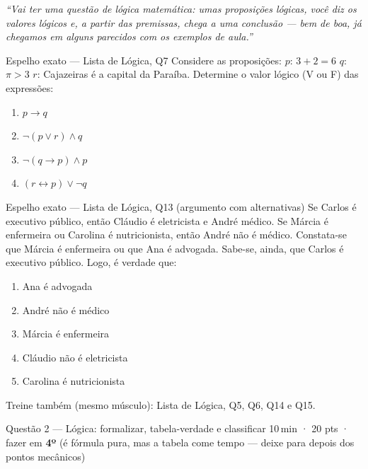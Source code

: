 \documentclass[11pt]{article}
\newcommand{\meta}[1]{{\small\color{inkgray}#1}}
\begin{document}
\begin{profquote}
\small\itshape ``Vai ter uma questão de lógica matemática: umas proposições lógicas, você diz os valores lógicos e, a partir das premissas, chega a uma conclusão — bem de boa, já chegamos em alguns parecidos com os exemplos de aula.''
\end{profquote}

\begin{espelhobox}{Espelho exato — Lista de Lógica, Q7}
Considere as proposições:
$p$: $3+2=6$ \quad $q$: $\pi>3$ \quad $r$: Cajazeiras é a capital da Paraíba.
Determine o valor lógico (V ou F) das expressões:
\begin{enumerate}[label=\alph*), leftmargin=2em]
  \item $p \to q$
  \item $\lnot(p \lor r) \land q$
  \item $\lnot(q \to p) \land p$
  \item $(r \leftrightarrow p) \lor \lnot q$
\end{enumerate}
\end{espelhobox}

\begin{espelhobox}{Espelho exato — Lista de Lógica, Q13 (argumento com alternativas)}
Se Carlos é executivo público, então Cláudio é eletricista e André médico. Se Márcia é enfermeira ou Carolina é nutricionista, então André não é médico. Constata-se que Márcia é enfermeira ou que Ana é advogada. Sabe-se, ainda, que Carlos é executivo público. Logo, é verdade que:
\begin{enumerate}[label=\Alph*), leftmargin=2em]
  \item Ana é advogada
  \item André não é médico
  \item Márcia é enfermeira
  \item Cláudio não é eletricista
  \item Carolina é nutricionista
\end{enumerate}
\end{espelhobox}

\meta{Treine também (mesmo músculo): Lista de Lógica, Q5, Q6, Q14 e Q15.}

\begin{questaobox}{Questão 2 — Lógica: formalizar, tabela-verdade e classificar}
\meta{10\,min · 20 pts · fazer em \textbf{4º} (é fórmula pura, mas a tabela come tempo — deixe para depois dos pontos mecânicos)}
\end{questaobox}
\end{document}
